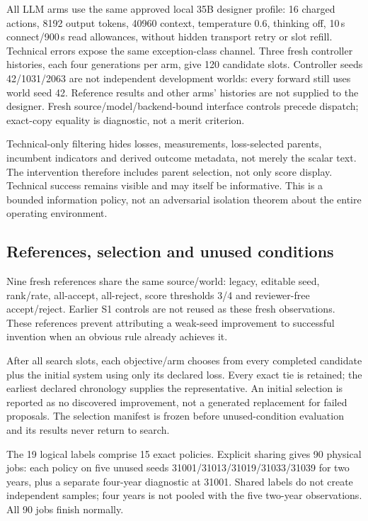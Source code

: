 All LLM arms use the same approved local 35B designer profile: 16 charged actions,
8192 output tokens, 40960 context, temperature 0.6, thinking off, 10\,s connect/900\,s
read allowances, without hidden transport retry or slot refill. Technical
errors expose the same exception-class channel. Three fresh controller
histories, each four generations per arm, give 120 candidate slots. Controller
seeds 42/1031/2063 are not independent development worlds: every forward still
uses world seed 42. Reference results and other arms' histories are not supplied
to the designer. Fresh source/model/backend-bound interface controls precede
dispatch; exact-copy equality is diagnostic, not a merit criterion.

Technical-only filtering hides losses, measurements, loss-selected parents,
incumbent indicators and derived outcome metadata, not merely the scalar text.
The intervention therefore includes parent selection, not only score display.
Technical success remains visible and may itself be informative. This is a
bounded information policy, not an adversarial isolation theorem about the
entire operating environment.

\subsection{References, selection and unused conditions}
Nine fresh references share the same source/world: legacy, editable seed,
rank/rate, all-accept, all-reject, score thresholds 3/4 and reviewer-free
accept/reject. Earlier S1 controls are not reused as these fresh observations.
These references prevent attributing a weak-seed improvement to successful
invention when an obvious rule already achieves it.

After all search slots, each objective/arm chooses from every completed
candidate plus the initial system using only its declared loss. Every exact
tie is retained; the earliest declared chronology supplies the representative.
An initial selection is reported as no discovered improvement, not a generated
replacement for failed proposals. The selection manifest is frozen before
unused-condition evaluation and its results never return to search.

The 19 logical labels comprise 15 exact policies. Explicit sharing gives 90
physical jobs: each policy on five unused seeds 31001/31013/31019/31033/31039
for two years, plus a separate four-year diagnostic at 31001. Shared labels
do not create independent samples; four years is not pooled with the five
two-year observations. All 90 jobs finish normally.

